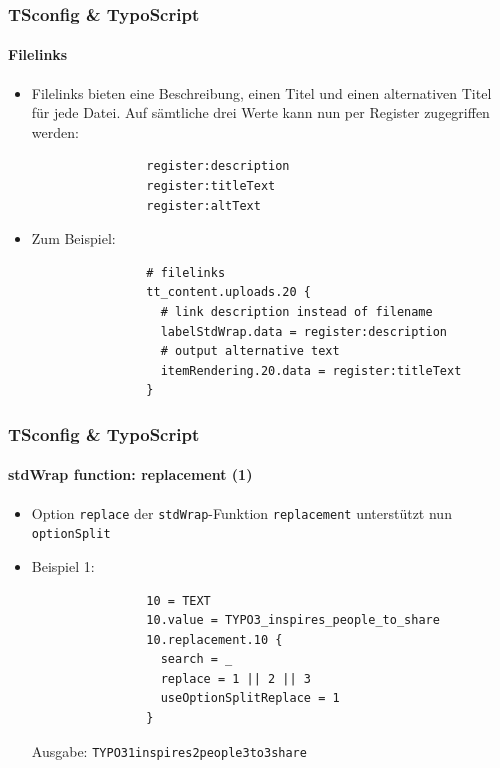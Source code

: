 \begin{frame}[fragile]
	\frametitle{TSconfig \& TypoScript}
	\framesubtitle{Filelinks}

	\begin{itemize}
		\item Filelinks bieten eine Beschreibung, einen Titel und einen alternativen Titel für jede Datei.
			Auf sämtliche drei Werte kann nun per Register zugegriffen werden:

			\begin{lstlisting}
				register:description
				register:titleText
				register:altText
			\end{lstlisting}

		\item Zum Beispiel:

			\begin{lstlisting}
				# filelinks
				tt_content.uploads.20 {
				  # link description instead of filename
				  labelStdWrap.data = register:description
				  # output alternative text
				  itemRendering.20.data = register:titleText
				}
			\end{lstlisting}

	\end{itemize}

\end{frame}


\begin{frame}[fragile]
	\frametitle{TSconfig \& TypoScript}
	\framesubtitle{stdWrap function: replacement (1)}

	\begin{itemize}
		\item Option \texttt{replace} der \texttt{stdWrap}-Funktion \texttt{replacement}\newline
			unterstützt nun \texttt{optionSplit}

		\item Beispiel 1:

			\begin{lstlisting}
				10 = TEXT
				10.value = TYPO3_inspires_people_to_share
				10.replacement.10 {
				  search = _
				  replace = 1 || 2 || 3
				  useOptionSplitReplace = 1
				}
			\end{lstlisting}

			Ausgabe:\newline
				\texttt{TYPO31inspires2people3to3share}

	\end{itemize}

\end{frame}

